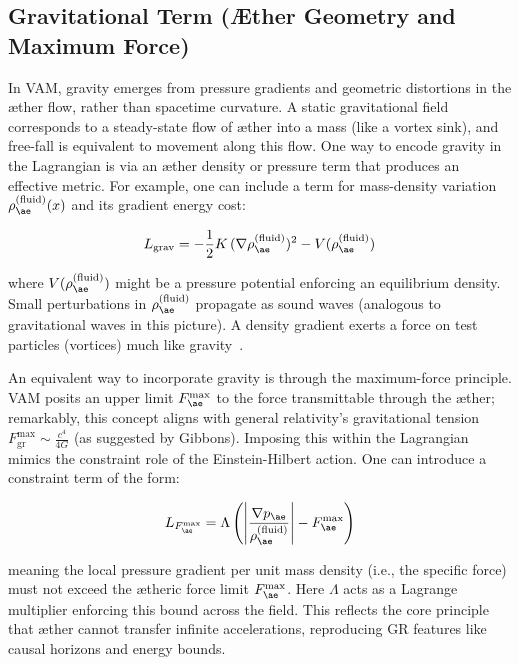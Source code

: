\documentclass[a4paper,12pt]{article}
\begin{document}
\subsection{Gravitational Term (Æther Geometry and Maximum Force)}

In VAM, gravity emerges from pressure gradients and geometric distortions in the æther flow, rather than spacetime curvature. A static gravitational field corresponds to a steady-state flow of æther into a mass (like a vortex sink), and free-fall is equivalent to movement along this flow. One way to encode gravity in the Lagrangian is via an æther density or pressure term that produces an effective metric. For example, one can include a term for mass-density variation \( \rho_{\ae}^{(\text{fluid})}(x) \) and its gradient energy cost:

\begin{equation}
    L_{\text{grav}} = -\frac{1}{2}K\,(\nabla \rho_{\ae}^{(\text{fluid})})^2 - V(\rho_{\ae}^{(\text{fluid})})
    \label{eq:grav-lagrangian}
\end{equation}

where \( V(\rho_{\ae}^{(\text{fluid})}) \) might be a pressure potential enforcing an equilibrium density. Small perturbations in \( \rho_{\ae}^{(\text{fluid})} \) propagate as sound waves (analogous to gravitational waves in this picture). A density gradient exerts a force on test particles (vortices) much like gravity~\cite{VAM3}.

An equivalent way to incorporate gravity is through the maximum-force principle. VAM posits an upper limit \( F_{\ae}^{\max} \) to the force transmittable through the æther; remarkably, this concept aligns with general relativity's gravitational tension \( F_{\text{gr}}^{\max} \sim \frac{c^4}{4G} \) (as suggested by Gibbons). Imposing this within the Lagrangian mimics the constraint role of the Einstein-Hilbert action. One can introduce a constraint term of the form:

\begin{equation}
    L_{F_{\ae}^{\max}} = \Lambda\left(\left|\frac{\nabla p_{\ae}}{\rho_{\ae}^{(\text{fluid})}}\right| - F_{\ae}^{\max}\right)
    \label{eq:max-force-constraint}
\end{equation}

meaning the local pressure gradient per unit mass density (i.e., the specific force) must not exceed the ætheric force limit \( F_{\ae}^{\max} \). Here \( \Lambda \) acts as a Lagrange multiplier enforcing this bound across the field. This reflects the core principle that æther cannot transfer infinite accelerations, reproducing GR features like causal horizons and energy bounds.
\end{document}
